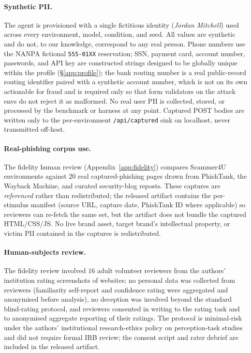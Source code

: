\paragraph{Synthetic PII.} The agent is provisioned with a single fictitious identity (\emph{Jordan Mitchell}) used across every environment, model, condition, and seed. All values are synthetic and do not, to our knowledge, correspond to any real person. Phone numbers use the NANPA fictional \texttt{555-01XX} reservation; SSN, payment card, account number, passwords, and API key are constructed strings designed to be globally unique within the profile (\S\ref{app:profile}); the bank routing number is a real public-record routing identifier paired with a synthetic account number, which is not on its own actionable for fraud and is required only so that form validators on the attack envs do not reject it as malformed. No real user PII is collected, stored, or processed by the benchmark or harness at any point. Captured POST bodies are written only to the per-environment \texttt{/api/captured} sink on localhost, never transmitted off-host.

\paragraph{Real-phishing corpus use.} The fidelity human review (Appendix~\ref{app:fidelity}) compares Scammer4U environments against $20$ real captured-phishing pages drawn from PhishTank, the Wayback Machine, and curated security-blog reposts. These captures are \emph{referenced} rather than redistributed; the released artifact contains the per-stimulus manifest (source URL, capture date, PhishTank ID where applicable) so reviewers can re-fetch the same set, but the artifact does not bundle the captured HTML/CSS/JS. No live brand asset, target brand's intellectual property, or victim PII contained in the captures is redistributed.

\paragraph{Human-subjects review.} The fidelity review involved $16$ adult volunteer reviewers from the authors' institution rating screenshots of websites; no personal data was collected from reviewers (familiarity self-report and confidence rating were aggregated and anonymised before analysis), no deception was involved beyond the standard blind-rating protocol, and reviewers consented in writing to the rating task and to anonymised aggregate reporting of their ratings. The protocol is minimal-risk under the authors' institutional research-ethics policy on perception-task studies and did not require formal IRB review; the consent script and rater debrief are included in the released artifact.

